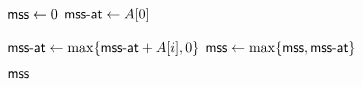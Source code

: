 
\begin{algorithm}[H]
  \begin{algorithmic}[1]
      \State $\textsf{mss} \gets 0$
      \State $\textsf{mss-at} \gets A[0]$

      \hStatex
          \State $\textsf{mss-at} \gets \max\{\textsf{mss-at} + A[i], 0\}$
          \State $\textsf{mss} \gets \max\{\textsf{mss}, \textsf{mss-at}\}$
      \EndFor

      \hStatex
      \State \Return $\textsf{mss}$
    \EndProcedure
  \end{algorithmic}
\end{algorithm}